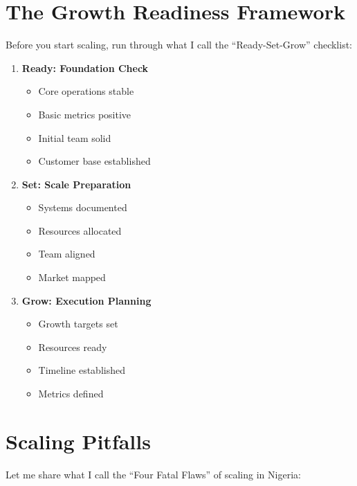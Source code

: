 \section{The Growth Readiness Framework}\label{sec:growth-readiness}

Before you start scaling, run through what I call the ``Ready-Set-Grow'' checklist:

\begin{tcolorbox}[colback=white,colframe=primarydark,title=\textbf{Growth Readiness Assessment}]
\begin{enumerate}
    \item \textbf{Ready: Foundation Check}
    \begin{itemize}
        \item Core operations stable
        \item Basic metrics positive
        \item Initial team solid
        \item Customer base established
    \end{itemize}

    \item \textbf{Set: Scale Preparation}
    \begin{itemize}
        \item Systems documented
        \item Resources allocated
        \item Team aligned
        \item Market mapped
    \end{itemize}

    \item \textbf{Grow: Execution Planning}
    \begin{itemize}
        \item Growth targets set
        \item Resources ready
        \item Timeline established
        \item Metrics defined
    \end{itemize}
\end{enumerate}
\end{tcolorbox}

\section{Scaling Pitfalls}\label{sec:scaling-pitfalls}

Let me share what I call the ``Four Fatal Flaws'' of scaling in Nigeria:

